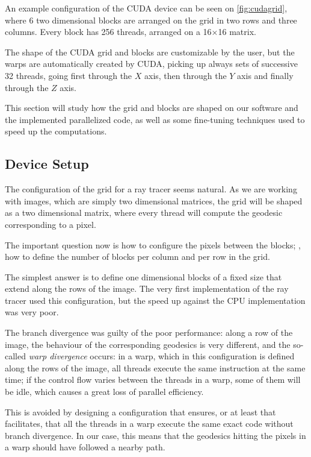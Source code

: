 An example configuration of the \ac{CUDA} device can be seen on \autoref{fig:cudagrid}, where 6 two dimensional blocks are arranged on the grid in two rows and three columns. Every block has 256 threads, arranged on a 16$\times$16 matrix.

The shape of the \ac{CUDA} grid and blocks are customizable by the user, but the warps are automatically created by \ac{CUDA}, picking up always sets of successive 32 threads, going first through the $X$ axis, then through the $Y$ axis and finally through the $Z$ axis.

This section will study how the grid and blocks are shaped on our software and the implemented parallelized code, as well as some fine-tuning techniques used to speed up the computations.

\subsection{Device Setup}

The configuration of the grid for a ray tracer seems natural. As we are working with images, which are simply two dimensional matrices, the grid will be shaped as a two dimensional matrix, where every thread will compute the geodesic corresponding to a pixel.

The important question now is how to configure the pixels between the blocks; \ie, how to define the number of blocks per column and per row in the grid.

The simplest answer is to define one dimensional blocks of a fixed size that extend along the rows of the image. The very first implementation of the ray tracer used this configuration, but the speed up against the \ac{CPU} implementation was very poor.

The branch divergence was guilty of the poor performance: along a row of the image, the behaviour of the corresponding geodesics is very different, and the so-called \emph{warp divergence} occurs: in a warp, which in this configuration is defined along the rows of the image, all threads execute the same instruction at the same time; if the control flow varies between the threads in a warp, some of them will be idle, which causes a great loss of parallel efficiency.

This is avoided by designing a configuration that ensures, or at least that facilitates, that all the threads in a warp execute the same exact code without branch divergence. In our case, this means that the geodesics hitting the pixels in a warp should have followed a nearby path.


